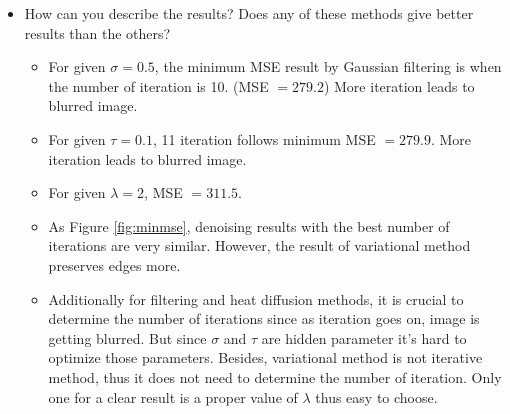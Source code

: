 \documentclass[paper=a4, fontsize=11pt]{scrartcl} %
\numberwithin{equation}{section} %
\numberwithin{figure}{section} %
\numberwithin{table}{section} %
\begin{document}
\begin{itemize}
	\item How can you describe the results? Does any of these methods give better results than the others? \\
	
	\begin{itemize}
		\item For given $\sigma = 0.5$, the minimum MSE result by Gaussian filtering is when the number of iteration is 10. (MSE $= 279.2$) More iteration leads to blurred image.
		\item For given $\tau = 0.1$, 11 iteration follows minimum MSE $= 279.9$. More iteration leads to blurred image.
		\item For given $\lambda = 2$, MSE $= 311.5$.
		\item As Figure \ref{fig:minmse}, denoising results with the best number of iterations are very similar. However, the result of variational method preserves edges more. 
		\item Additionally for filtering and heat diffusion methods, it is crucial to determine the number of iterations since as iteration goes on, image is getting blurred. But since $\sigma$ and $\tau$ are hidden parameter it's hard to optimize those parameters. Besides, variational method is not iterative method, thus it does not need to determine the number of iteration. Only one for a clear result is a proper value of $\lambda$ thus easy to choose.
	

\end{itemize}
\end{itemize}
\end{document}
